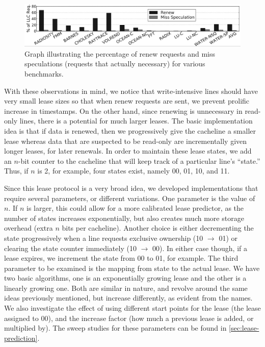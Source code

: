 \documentclass[12pt]{article}
\begin{document}
\begin{figure}
\begin{center}
  \includegraphics[width=16cm]{image1.png}
  \caption{Graph illustrating the percentage of renew requests and miss speculations (requests that actually necessary) for various benchmarks. }
  \label{fig:renewals}
\end{center}
\end{figure}

With these observations in mind, we notice that write-intensive lines should have very small lease sizes so that when renew requests are sent, we prevent prolific increase in timestamps. On the other hand, since renewing is unnecessary in read-only lines, there is a potential for much larger leases.
The basic implementation idea is that if data is renewed, then we progressively give the cacheline a smaller lease whereas data that are suspected to be read-only are incrementally given longer leases, for later renewals. In order to maintain these lease states, we add an $n$-bit counter to the cacheline that will keep track of a particular line’s “state.” Thus, if $n$ is 2, for example, four states exist, namely 00, 01, 10, and 11. 

Since this lease protocol is a very broad idea, we developed implementations that require several parameters, or different variations. One parameter is the value of $n$. If $n$ is larger, this could allow for a more calibrated lease predictor, as the number of states increases exponentially, but also creates much more storage overhead (extra $n$ bits per cacheline). Another choice is either decrementing the state progressively when a line requests exclusive ownership (10 $\rightarrow$ 01) or clearing the state counter immediately (10 $\rightarrow$ 00). In either case though, if a lease expires, we increment the state from 00 to 01, for example. The third parameter to be examined is the mapping from state to the actual lease. We have two basic algorithms, one is an exponentially growing lease and the other is a linearly growing one. Both are similar in nature, and revolve around the same ideas previously mentioned, but increase differently, as evident from the names. We also investigate the effect of using different start points for the lease (the lease assigned to 00), and the increase factor (how much a previous lease is added, or multiplied by). The sweep studies for these parameters can be found in \cref{sec:lease-prediction}.
\end{document}
